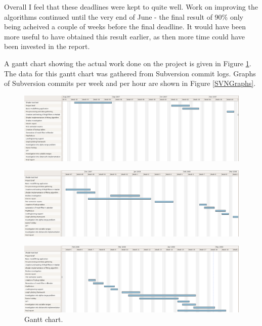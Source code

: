 Overall I feel that these deadlines were kept to quite well.
Work on improving the algorithms continued until the very end of June - the final result of 90\% only being acheived a couple of weeks before the final deadline.
It would have been more useful to have obtained this result earlier, as then more time could have been invested in the report.

A gantt chart showing the actual work done on the project is given in Figure \ref{GanttChart}.
The data for this gantt chart was gathered from Subversion commit logs.
Graphs of Subversion commits per week and per hour are shown in Figure \ref{SVNGraphs}.

\begin{landscape}
	\begin{figure}[p]
		\centering
		\includegraphics[width=21cm]{gantt.png}
	\end{figure}
	\begin{figure}[p]
		\centering
		\includegraphics[width=21cm]{gantt2.png}
	\end{figure}
	\begin{figure}[p]
		\centering
		\includegraphics[width=21cm]{gantt3.png}
		\caption{Gantt chart.}
		\label{GanttChart}
	\end{figure}
\end{landscape}


